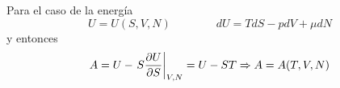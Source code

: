 \documentclass[10pt,oneside]{CBFT_book}
\begin{document}
Para el caso de la energía
\[
	U=U(S,V,N) \qquad \qquad dU = TdS - pdV + \mu dN
\]
y entonces
\[
	A = U - \left. S\frac{\partial^{\hspace{-0.05em}} {U}}{\partial {S}^{\hspace{-0.05em}}}\right|_{V,N} = U - ST \Rightarrow A=A(T,V,N)
\]
% 
% 
% 
% 
\end{document}

